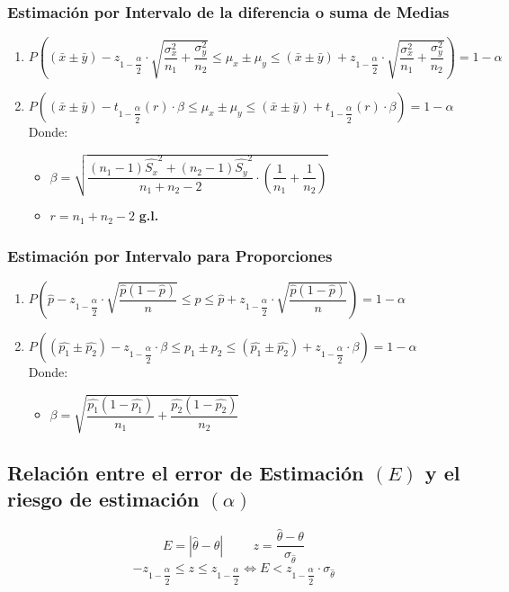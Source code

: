 \documentclass[10pt,letterpaper]{article}
\begin{document}
\subsubsection{Estimación por Intervalo de la diferencia o suma de Medias}
\begin{enumerate}[label=(\roman*)]
  \item $P\left( (\bar{x}\pm\bar{y}) - z_{1-\dfrac{\alpha}{2}}\cdot \sqrt{\dfrac{\sigma_{x}^2}{n_1}+\dfrac{\sigma_{y}^2}{n_2}} \leq \mu_x\pm\mu_y \leq (\bar{x}\pm\bar{y}) + z_{1-\dfrac{\alpha}{2}}\cdot \sqrt{\dfrac{\sigma_{x}^2}{n_1}+\dfrac{\sigma_{y}^2}{n_2}} \right)=1-\alpha$ 
  \item $P\left( (\bar{x}\pm\bar{y})-t_{1-\dfrac{\alpha
  }{2}}(r)\cdot\beta\leq \mu_x\pm\mu_y \leq (\bar{x}\pm\bar{y})+t_{1-\dfrac{\alpha
  }{2}}(r)\cdot\beta\right)=1-\alpha$\vspace{0.5cm}\\
  Donde:
  \begin{itemize}
  \item $\beta = \sqrt{\dfrac{(n_1-1)\hat{S_x}^2+(n_2-1)\hat{S_y}^2}{n_1+n_2-2}\cdot\left(\dfrac{1}{n_1}+\dfrac{1}{n_2}\right)}$
  \item $r=n_1+n_2-2$ \textbf{g.l.}
   \end{itemize}
\end{enumerate}
\subsubsection{Estimación por Intervalo para Proporciones}
\begin{enumerate}[label=(\roman*)]
\item $P\left(\hat{p}-z_{1-\dfrac{\alpha}{2}}\cdot\sqrt{\dfrac{\hat{p}(1-\hat{p})}{n}}\leq p \leq \hat{p}+z_{1-\dfrac{\alpha}{2}}\cdot\sqrt{\dfrac{\hat{p}(1-\hat{p})}{n}}  \right)=1-\alpha$
\item $P\left((\widehat{p_1}\pm\widehat{p_2})-z_{1-\dfrac{\alpha}{2}}\cdot\beta\leq p_1\pm p_2\leq (\widehat{p_1}\pm\widehat{p_2})+z_{1-\dfrac{\alpha}{2}}\cdot\beta\right)=1-\alpha$\\
 Donde:
  \begin{itemize}
  \item $\beta = \sqrt{\dfrac{\hat{p_1}(1-\hat{p_1})}{n_1}+\dfrac{\hat{p_2}(1-\hat{p_2})}{n_2}} $
   \end{itemize}
\end{enumerate}
\subsection{Relación entre el error de Estimación $(E)$ y el riesgo de estimación $(\alpha)$}
$$
E = |\hat{\theta}-\theta| \hspace{1cm} z = \dfrac{\hat{\theta}-\theta}{\sigma_{\hat{\theta}}}
$$
$$
-z_{1-\dfrac{\alpha}{2}} \leq z \leq z_{1-\dfrac{\alpha}{2}} \Leftrightarrow E < z_{1-\dfrac{\alpha}{2}} \cdot \sigma_{\hat{\theta}}
$$
\end{document}
